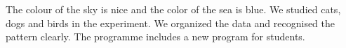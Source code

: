 The colour of the sky is nice and the color of the sea is blue.
We studied cats, dogs and birds in the experiment.
We organized the data and recognised the pattern clearly.
The programme includes a new program for students.
